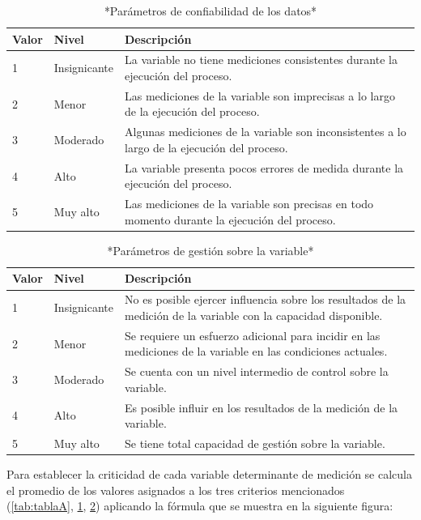 \documentclass[
]{book}
\begin{document}
\begin{table}

\caption{\label{tab:tablaB}*Parámetros de confiabilidad de los datos*}
\centering
\begin{tabular}[t]{l|l|l}
\hline
Valor & Nivel & Descripción\\
\hline
1 & Insignicante & La variable no tiene mediciones consistentes durante la ejecución del proceso.\\
\hline
2 & Menor & Las mediciones de la variable son imprecisas a lo largo de la ejecución del proceso.\\
\hline
3 & Moderado & Algunas mediciones de la variable son inconsistentes a lo largo de la ejecución del proceso.\\
\hline
4 & Alto & La variable presenta pocos errores de medida durante la ejecución del proceso.\\
\hline
5 & Muy alto & Las mediciones de la variable son precisas en todo momento durante la ejecución del proceso.\\
\hline
\end{tabular}
\end{table}

\begin{table}

\caption{\label{tab:tablaC}*Parámetros de gestión sobre la variable*}
\centering
\begin{tabular}[t]{l|l|l}
\hline
Valor & Nivel & Descripción\\
\hline
1 & Insignicante & No es posible ejercer influencia sobre los resultados de la medición de la variable con la capacidad disponible.\\
\hline
2 & Menor & Se requiere un esfuerzo adicional para incidir en las mediciones de la variable en las condiciones actuales.\\
\hline
3 & Moderado & Se cuenta con un nivel intermedio de control sobre la variable.\\
\hline
4 & Alto & Es posible influir en los resultados de la medición de la variable.\\
\hline
5 & Muy alto & Se tiene total capacidad de gestión sobre la variable.\\
\hline
\end{tabular}
\end{table}

Para establecer la criticidad de cada variable determinante de medición se calcula el promedio de los valores asignados a los tres criterios mencionados (\ref{tab:tablaA}, \ref{tab:tablaB}, \ref{tab:tablaC}) aplicando la fórmula que se muestra en la siguiente figura:
\end{document}
